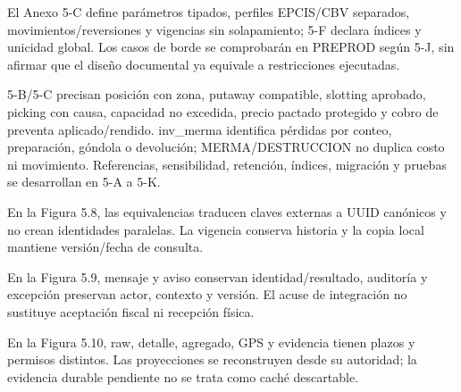 El Anexo 5-C define parámetros tipados, perfiles EPCIS/CBV separados, movimientos/reversiones y vigencias sin solapamiento; 5-F declara índices y unicidad global. Los casos de borde se comprobarán en PREPROD según 5-J, sin afirmar que el diseño documental ya equivale a restricciones ejecutadas.

5-B/5-C precisan posición con zona, putaway compatible, slotting aprobado, picking con causa, capacidad no excedida, precio pactado protegido y cobro de preventa aplicado/rendido. inv\_merma identifica pérdidas por conteo, preparación, góndola o devolución; MERMA/DESTRUCCION no duplica costo ni movimiento. Referencias, sensibilidad, retención, índices, migración y pruebas se desarrollan en 5-A a 5-K.

En la Figura 5.8, las equivalencias traducen claves externas a UUID canónicos y no crean identidades paralelas. La vigencia conserva historia y la copia local mantiene versión/fecha de consulta.

En la Figura 5.9, mensaje y aviso conservan identidad/resultado, auditoría y excepción preservan actor, contexto y versión. El acuse de integración no sustituye aceptación fiscal ni recepción física.

En la Figura 5.10, raw, detalle, agregado, GPS y evidencia tienen plazos y permisos distintos. Las proyecciones se reconstruyen desde su autoridad; la evidencia durable pendiente no se trata como caché descartable.
